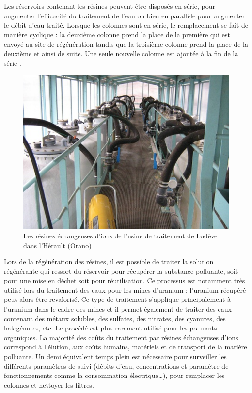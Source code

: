 \documentclass{article}
\begin{document}
Les réservoirs contenant les résines peuvent être disposés en série, pour augmenter l’efficacité du traitement de l’eau ou bien en parallèle pour augmenter le débit d’eau traité. Lorsque les colonnes sont en série, le remplacement se fait de manière cyclique : la deuxième colonne prend la place de la première qui est envoyé au site de régénération tandis que la troisième colonne prend la place de la deuxième et ainsi de suite. Une seule nouvelle colonne est ajoutée à la fin de la série \cite{schick_informations_2020}.

\begin{figure}[H]
\centering
\includegraphics[width=0.6\linewidth]{III_A_3.png}
\caption{Les résines échangeuses d'ions de l'usine de traitement de Lodève dans l'Hérault (Orano)}
\label{fig:usine_traitement_resines}
\end{figure}

Lors de la régénération des résines, il est possible de traiter la solution régénérante qui ressort du réservoir pour récupérer la substance polluante, soit pour une mise en déchet soit pour réutilisation. Ce processus est notamment très utilisé lors du traitement des eaux pour les mines d’uranium : l’uranium récupéré peut alors être revalorisé.
Ce type de traitement s’applique principalement à l’uranium dans le cadre des mines et il permet également de traiter des eaux contenant des métaux solubles, des sulfates, des nitrates, des cyanures, des halogénures, etc. Le procédé est plus rarement utilisé pour les polluants organiques.
La majorité des coûts du traitement par résines échangeuses d’ions correspond à l’élution, aux coûts humains, matériels et de transport de la matière polluante. Un demi équivalent temps plein est nécessaire pour surveiller les différents paramètres de suivi (débits d’eau, concentrations et paramètre de fonctionnements comme la consommation électrique…), pour remplacer les colonnes et nettoyer les filtres.
\end{document}
